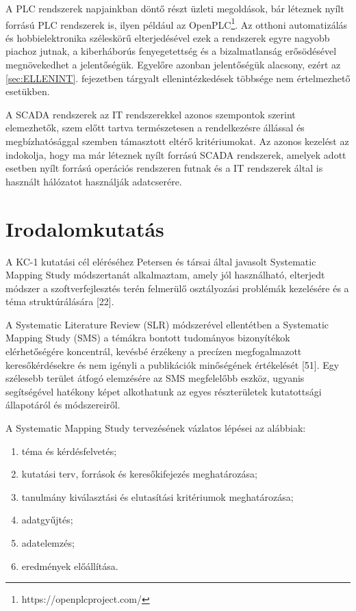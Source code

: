 \documentclass[12pt,magyar,a4paper,oneside]{scrreprt}
\providecommand{\tightlist}{%
  \setlength{\itemsep}{0pt}\setlength{\parskip}{0pt}}
\begin{document}
A PLC rendszerek napjainkban döntő részt üzleti megoldások, bár léteznek
nyílt forrású PLC rendszerek is, ilyen például az OpenPLC\footnote{https://openplcproject.com/}.
Az otthoni automatizálás és hobbielektronika széleskörű elterjedésével
ezek a rendszerek egyre nagyobb piachoz jutnak, a kiberháborús
fenyegetettség és a bizalmatlanság erősödésével megnövekedhet a
jelentőségük. Egyelőre azonban jelentőségük alacsony, ezért az
\ref{sec:ELLENINT}. fejezetben tárgyalt ellenintézkedések többsége nem
értelmezhető esetükben.

A SCADA rendszerek az IT rendszerekkel azonos szempontok szerint
elemezhetők, szem előtt tartva természetesen a rendelkezésre állással és
megbízhatósággal szemben támasztott eltérő kritériumokat. Az azonos
kezelést az indokolja, hogy ma már léteznek nyílt forrású SCADA
rendszerek, amelyek adott esetben nyílt forrású operációs rendszeren
futnak és a IT rendszerek által is használt hálózatot használják
adatcserére.

\hypertarget{irodalomkutatuxe1s}{%
\section{Irodalomkutatás}\label{irodalomkutatuxe1s}}

A KC-1 kutatási cél eléréséhez Petersen és társai által javasolt
Systematic Mapping Study módszertanát alkalmaztam, amely jól
használható, elterjedt módszer a szoftverfejlesztés terén felmerülő
osztályozási problémák kezelésére és a téma struktúrálására {[}22{]}.

A Systematic Literature Review (SLR) módszerével ellentétben a
Systematic Mapping Study (SMS) a témákra bontott tudományos bizonyítékok
elérhetőségére koncentrál, kevésbé érzékeny a precízen megfogalmazott
keresőkérdésekre és nem igényli a publikációk minőségének értékelését
{[}51{]}. Egy szélesebb terület átfogó elemzésére az SMS megfelelőbb
eszköz, ugyanis segítségével hatékony képet alkothatunk az egyes
részterületek kutatottsági állapotáról és módszereiről.

A Systematic Mapping Study tervezésének vázlatos lépései az alábbiak:

\begin{enumerate}
\def\labelenumi{\arabic{enumi}.}
\tightlist
\item
  téma és kérdésfelvetés;
\item
  kutatási terv, források és keresőkifejezés meghatározása;
\item
  tanulmány kiválasztási és elutasítási kritériumok meghatározása;
\item
  adatgyűjtés;
\item
  adatelemzés;
\item
  eredmények előállítása.
\end{enumerate}
\end{document}
